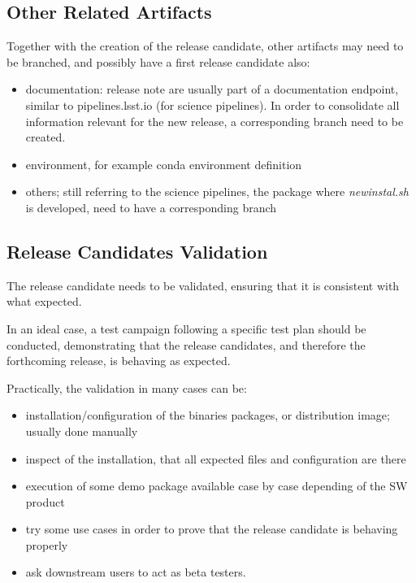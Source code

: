 \subsection{Other Related Artifacts}

Together with the creation of the release candidate, other artifacts may need to be branched, and possibly have a first release candidate also:

\begin{itemize}
\item documentation: release note are usually part of a documentation endpoint, similar to pipelines.lsst.io (for science pipelines). In order to consolidate all information relevant for the new release, a corresponding branch need to be created.
\item environment, for example conda environment definition
\item others; still referring to the science pipelines, the package where \textit{newinstal.sh} is developed, need to have a corresponding branch
\end{itemize}


\subsection{Release Candidates Validation} \label{sec:rcvalidation}

The release candidate needs to be validated, ensuring that it is consistent with what expected.

In an ideal case, a test campaign following a specific test plan should be conducted, demonstrating that the release candidates, and therefore the forthcoming release, is behaving as expected.

Practically, the validation in many cases can be:

\begin{itemize}
\item installation/configuration of the binaries packages, or distribution image; usually done manually
\item inspect of the installation, that all expected files and configuration are there
\item execution of some demo package available case by case depending of the SW product
\item try some use cases in order to prove that the release candidate is behaving properly
\item ask downstream users to act as beta testers.
\end{itemize}


